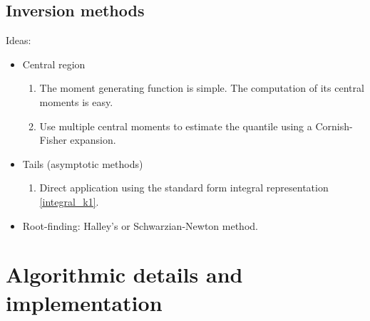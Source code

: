 \documentclass[10pt,a4paper,oneside]{article}
\numberwithin{equation}{section}
\begin{document}
%


\subsection{Inversion methods}
Ideas:
\begin{itemize}
\item Central region
\begin{enumerate}
\item The moment generating function is simple. The computation of its central moments is easy.
\item Use multiple central moments to estimate the quantile using a Cornish-Fisher expansion.
\end{enumerate}
\item Tails (asymptotic methods) \cite[\S 42]{Temme2015}
\begin{enumerate}
\item Direct application using the standard form integral representation \eqref{integral_k1}.
\end{enumerate}
\item Root-finding: Halley's or Schwarzian-Newton method.
\end{itemize}

\section{Algorithmic details and implementation}
\end{document}
